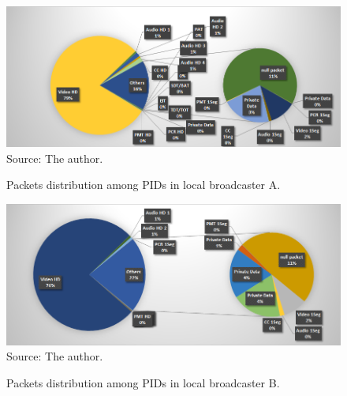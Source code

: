 \documentclass[12pt,a4paper]{article}
\begin{document}
\begin{figure}[!h]
\centering
\caption{Packets distribution among PIDs in local broadcaster A.}
\includegraphics[width=0.9\linewidth]{pictures/graph_rbs_dump.png}
\\Source: The author.
\label{fig:graph_rbs_dump}
\end{figure}

\begin{figure}[!h]
\centering
\caption{Packets distribution among PIDs in local broadcaster B.}
\includegraphics[width=0.9\linewidth]{pictures/graph_band_dump.png}
\\Source: The author.
\label{fig:graph_band_dump}
\end{figure}
\end{document}
